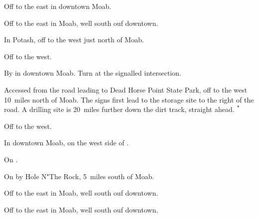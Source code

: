 
\begin{LocationList}

Off  to the east in downtown Moab.

Off  to the east in Moab, well south ouf downtown.

In Potash, off  to the west just north of Moab.

Off  to the west.

By  in downtown Moab.
Turn at the signalled intersection.

Accessed from the road leading to Dead Horse Point State Park, off  to the west 10~miles north of Moab.
The signs first lead to the storage site to the right of the road.
A drilling site is 20~miles further down the dirt track, straight ahead.%
\textsuperscript{\scriptsize $\ast$}

\Location{\GarageHQ \Garage}
Off  to the west.

\Location{\GasStation \Gas}
In downtown Moab, on the west side of .

\Location{\RecruitmentAgency \Recruitment}
On .

\Location{\RestArea \Rest}
On  by Hole N"The Rock, 5~miles south of Moab.

Off  to the east in Moab, well south ouf downtown.

\Location{\TruckService \Service}
Off  to the east in Moab, well south ouf downtown.

\end{LocationList}
